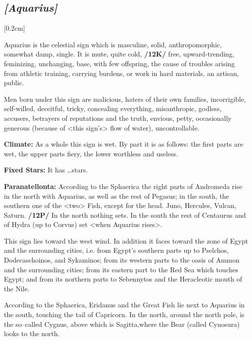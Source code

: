 \secbr
\subsection{\textit{[Aquarius]}}
[0.2cm]

 Aquarius is the celestial sign which is  masculine,  solid,  anthropomorphic, somewhat damp, single. It is  mute, quite cold, \textbf{/12K/} free, upward-trending, feminizing, unchanging, base, with few offspring, the cause of troubles arising from athletic training, carrying burdens, or work in hard materials, an artisan, public. 

Men born under this sign are malicious, haters of their own families, incorrigible, self-willed, deceitful, tricky, concealing everything, misanthropic, godless, accusers, betrayers of reputations and the truth, envious, petty, occasionally generous (because of <this sign’s> flow of water), uncontrollable.

\textbf{Climate:} As a whole this sign is wet. By part it is as follows: the first parts are wet, the upper parts fiery, the lower worthless and useless. 

\textbf{Fixed Stars:} It has …stars. 

\textbf{Paranatellonta:} According to the Sphaerica the right parts of Andromeda rise in the north with Aquarius, as well as the rest of Pegasus; in the south, the southern one of the <two> Fish, except for the head. Juno, Hercules, Vulcan, Saturn. \textbf{/12P/} In the north nothing sets. In the south
the rest of Centaurus and of Hydra (up to Corvus) set <when Aquarius rises>. 

This sign lies toward the west wind. In addition it faces toward the zone of Egypt and the surrounding cities, i.e. from Egypt’s southern parts up to Pselchos, Dodecaschoinos, and Sykaminos; from its western parts to the oasis of Ammon and the surrounding cities; from its eastern part to the Red Sea which touches Egypt; and from its
northern parts to Sebennytos and the Heracleotic mouth of the Nile.

According to the Sphaerica, Eridanus and the Great Fish lie next to Aquarius in the south, touching the tail of Capricorn. In the north, around the north pole, is the so–called Cygnus, above which is Sagitta,where the Bear (called Cynosura) looks to the north. 

